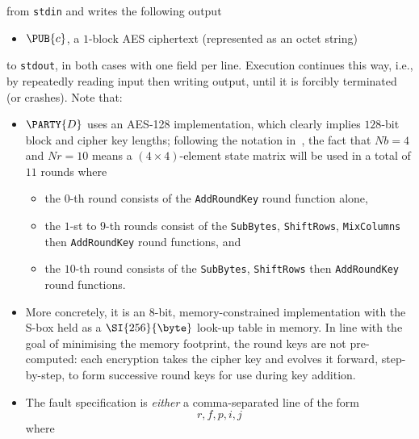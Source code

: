 \documentclass[crop={false},multi={true},tikz={true}]{standalone}
\begin{document}
\noindent
from \lstinline[language={bash}]{stdin} and writes the following output

\begin{itemize}
\item $\PUB{c}$,
      a  ${1}$-block AES ciphertext
      (represented as an octet string)
\end{itemize}

\noindent
to \lstinline[language={bash}]{stdout}, in both cases with one field per 
line.  Execution continues this way, i.e., by repeatedly reading input 
then writing output, until it is forcibly terminated (or crashes).  
Note that:

\begin{itemize}
\item $\PARTY{D}$ uses an AES-128 implementation,
      which clearly implies $128$-bit block and cipher key lengths;
      following the notation in~\cite[Figure 5]{SCALE:FIPS:197:01}, the 
      fact that $Nb=4$ and $Nr=10$ means a $(4 \times 4)$-element state 
      matrix will be used in a total of $11$ rounds
      where

      \begin{itemize}
      \item the  $0$-th           round  consists of the
            \lstinline{AddRoundKey}
            round function  alone,
      \item the  $1$-st to $9$-th rounds consist  of the
            \lstinline{SubBytes}, \lstinline{ShiftRows},  \lstinline{MixColumns} then  \lstinline{AddRoundKey}
            round functions,
            and
      \item the $10$-th           round  consists of the
            \lstinline{SubBytes}, \lstinline{ShiftRows}                          then  \lstinline{AddRoundKey}
            round functions.
      \end{itemize}

\item More concretely, it is an $8$-bit, memory-constrained implementation
      with the S-box held as a $\SI{256}{\byte}$ look-up table in memory. 
      In line with the goal of minimising the memory footprint, the round
      keys are not pre-computed: each encryption takes the cipher key and
      evolves it forward, step-by-step, to form successive round keys for
      use during key addition.  
\item The fault specification is {\em either} a comma-separated line of the
      form
      \[
      r, f, p, i, j
      \]
      where


\end{itemize}
\end{document}
